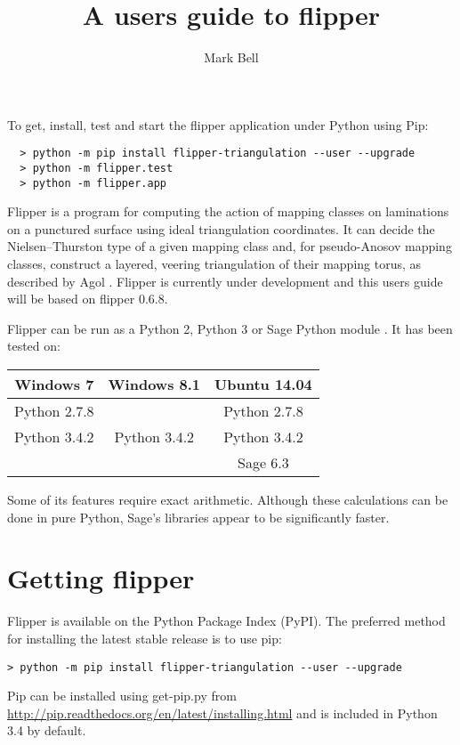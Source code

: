 \documentclass[a4paper]{article}
\title{A users guide to flipper}
\author{Mark Bell}
\begin{document}
\maketitle

\begin{center}
\begin{minipage}{0.8\linewidth}
\begin{framed}
  To get, install, test and start the flipper application under Python using Pip:
  \begin{lstlisting}
  > python -m pip install flipper-triangulation --user --upgrade
  > python -m flipper.test
  > python -m flipper.app
  \end{lstlisting}
\end{framed}
\end{minipage}
\end{center}

Flipper is a program for computing the action of mapping classes on laminations on a punctured surface using ideal triangulation coordinates. It can decide the Nielsen--Thurston type of a given mapping class and, for pseudo-Anosov mapping classes, construct a layered, veering triangulation of their mapping torus, as described by Agol \cite{Agol}. Flipper is currently under development and this users guide will be based on flipper 0.6.8.


Flipper can be run as a Python 2, Python 3 or Sage Python module \cite{sage}. It has been tested on:

\begin{center}
\begin{tabular}{c|c|c}
Windows 7 & Windows 8.1 & Ubuntu 14.04 \\
\hline
Python 2.7.8 & & Python 2.7.8 \\
Python 3.4.2 & Python 3.4.2 & Python 3.4.2 \\
 & & Sage 6.3 \\
\end{tabular}
\end{center}

Some of its features require exact arithmetic. Although these calculations can be done in pure Python, Sage's libraries appear to be significantly faster.

\section{Getting flipper}

Flipper is available on the Python Package Index (PyPI). The preferred method for installing the latest stable release is to use pip:
\begin{lstlisting}
> python -m pip install flipper-triangulation --user --upgrade
\end{lstlisting}
Pip can be installed using get-pip.py from \url{http://pip.readthedocs.org/en/latest/installing.html} and is included in Python 3.4 by default.
\end{document}

